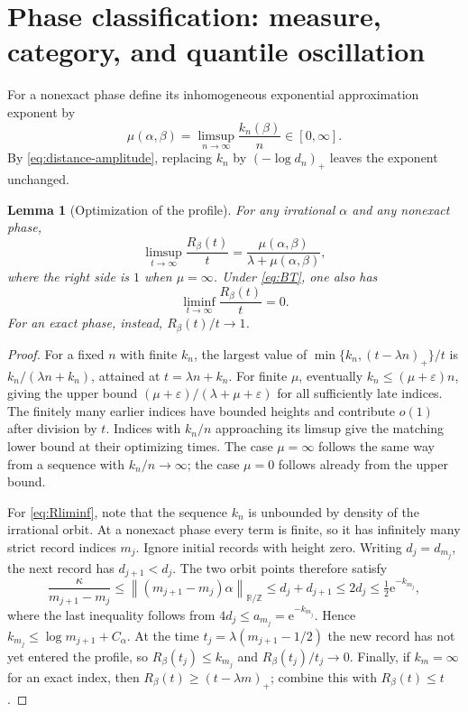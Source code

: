 \documentclass[11pt,a4paper]{article}
\newtheorem{lemma}[theorem]{Lemma}
\theoremstyle{definition}
\theoremstyle{remark}\newtheorem{remark}[theorem]{Remark}
\newcommand{\T}{\mathbb R/\mathbb Z}
\newcommand{\dn}[1]{\left\|#1\right\|_{\T}}
\newcommand{\e}{\mathrm e}
\newcommand{\eps}{\varepsilon}
\begin{document}
\section{Phase classification: measure, category, and quantile oscillation}
\label{sec:phases}

For a nonexact phase define its inhomogeneous exponential approximation
exponent by
\begin{equation}
 \mu(\alpha,\beta)=\limsup_{n\to\infty}\frac{k_n(\beta)}n
                      \in[0,\infty].
 \label{eq:mu}
\end{equation}
By \eqref{eq:distance-amplitude}, replacing $k_n$ by
$(-\log d_n)_+$ leaves the exponent unchanged.

\begin{lemma}[Optimization of the profile]
\label{lem:profilespectrum}
For any irrational $\alpha$ and any nonexact phase,
\begin{equation}
 \limsup_{t\to\infty}\frac{R_\beta(t)}t
       =\frac{\mu(\alpha,\beta)}{\lambda+\mu(\alpha,\beta)},
 \label{eq:Rlimsup}
\end{equation}
where the right side is $1$ when $\mu=\infty$.  Under \eqref{eq:BT}, one
also has
\begin{equation}
 \liminf_{t\to\infty}\frac{R_\beta(t)}t=0.
 \label{eq:Rliminf}
\end{equation}
For an exact phase, instead, $R_\beta(t)/t\to1$.
\end{lemma}
\begin{proof}
For a fixed $n$ with finite $k_n$, the largest value of
$\min\{k_n,(t-\lambda n)_+\}/t$ is
$k_n/(\lambda n+k_n)$, attained at $t=\lambda n+k_n$.
For finite $\mu$, eventually $k_n\le(\mu+\eps)n$, giving the upper bound
$(\mu+\eps)/(\lambda+\mu+\eps)$ for all sufficiently late indices.
The finitely many earlier indices have bounded heights and contribute
$o(1)$ after division by $t$.  Indices with $k_n/n$ approaching its limsup
give the matching lower bound at their optimizing times.  The case
$\mu=\infty$ follows the same way from a sequence with $k_n/n\to\infty$;
the case $\mu=0$ follows already from the upper bound.

For \eqref{eq:Rliminf}, note that the sequence $k_n$ is unbounded by density
of the irrational orbit.  At a nonexact phase every term is finite, so it
has infinitely many strict record indices $m_j$.  Ignore initial records
with height zero.  Writing $d_j=d_{m_j}$, the next record has
$d_{j+1}<d_j$.  The two orbit points therefore satisfy
\[
 \frac{\kappa}{m_{j+1}-m_j}
 \le\dn{(m_{j+1}-m_j)\alpha}
 \le d_j+d_{j+1}
 \le2d_j\le\tfrac12\e^{-k_{m_j}},
\]
where the last inequality follows from $4d_j\le a_{m_j}=\e^{-k_{m_j}}$.
Hence $k_{m_j}\le\log m_{j+1}+C_\alpha$.
At the time $t_j=\lambda(m_{j+1}-1/2)$ the new record has not yet entered
the profile, so $R_\beta(t_j)\le k_{m_j}$ and
$R_\beta(t_j)/t_j\to0$.
Finally, if $k_m=\infty$ for an exact index, then
$R_\beta(t)\ge(t-\lambda m)_+$; combine this with $R_\beta(t)\le t$.
\end{proof}
\end{document}
